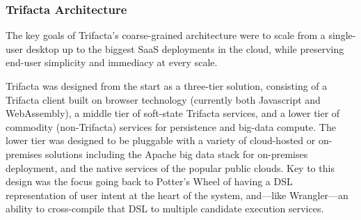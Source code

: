 \documentclass[11pt]{article}
\begin{document}
\subsubsection{Trifacta Architecture}


The key goals of Trifacta's coarse-grained architecture were to scale from a single-user desktop up to the biggest SaaS deployments in the cloud, while preserving end-user simplicity and immediacy at every scale.

Trifacta was designed from the start as a three-tier solution, consisting of a Trifacta client built on browser technology (currently both Javascript and WebAssembly), a middle tier of soft-state Trifacta services, and a lower tier of commodity (non-Trifacta) services for persistence and big-data compute. The lower tier was designed to be pluggable with a variety of cloud-hosted or on-premises solutions including the Apache big data stack for on-premises deployment, and the native services of the popular public clouds. Key to this design was the focus going back to Potter's Wheel of having a DSL representation of user intent at the heart of the system, and---like Wrangler---an ability to cross-compile that DSL to multiple candidate execution services.
\end{document}
